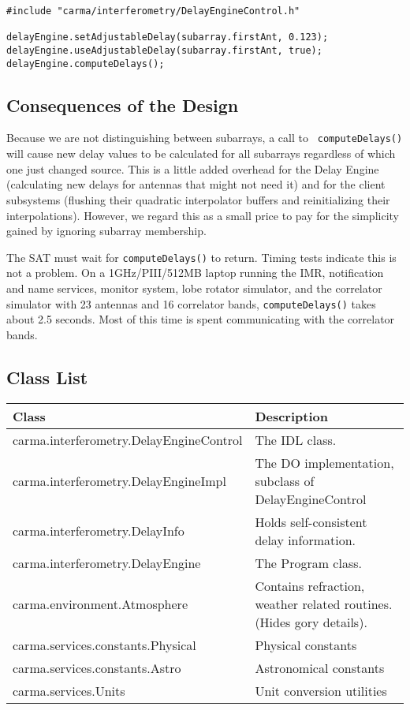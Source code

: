 \documentclass[preprint]{aastex}
\begin{document}
\begin{verbatim}
#include "carma/interferometry/DelayEngineControl.h"

delayEngine.setAdjustableDelay(subarray.firstAnt, 0.123);
delayEngine.useAdjustableDelay(subarray.firstAnt, true);
delayEngine.computeDelays();
\end{verbatim}


\subsection{Consequences of the Design}

Because we are not distinguishing between subarrays, a call to {\tt
computeDelays()} will cause new delay values to be calculated for
all subarrays regardless of which one just changed source.  This is
a little added overhead for the Delay Engine (calculating new delays
for antennas that might not need it) and for the client subsystems
(flushing their quadratic interpolator buffers and reinitializing
their interpolations).  However, we regard this as a small price
to pay for the simplicity gained by ignoring subarray membership.

The SAT must wait for {\tt computeDelays()} to return.  Timing tests
indicate this is not a problem.  On a 1GHz/PIII/512MB laptop running the
IMR, notification and name services, monitor system, lobe rotator simulator,
and the correlator simulator with 23 antennas and 16 correlator bands,
{\tt computeDelays()} takes about 2.5 seconds. Most of this time is
spent communicating with the correlator bands.

\subsection{Class List}
\begin{tabular}{ll}
\hline
Class & Description \\
\hline
carma.interferometry.DelayEngineControl & The IDL class. \\
carma.interferometry.DelayEngineImpl & The DO implementation, 
subclass of DelayEngineControl \\
carma.interferometry.DelayInfo       & Holds self-consistent delay information.\\
carma.interferometry.DelayEngine     & The Program class. \\
carma.environment.Atmosphere         & Contains refraction, weather related
routines. (Hides gory details).\\
carma.services.constants.Physical    & Physical constants \\
carma.services.constants.Astro       & Astronomical constants\\
carma.services.Units                 & Unit conversion utilities \\
\hline
\end{tabular}
\end{document}

